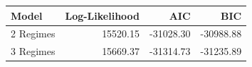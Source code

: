 \begin{tabular}{lrrr}
\toprule
Model & Log-Likelihood & AIC & BIC \\
\midrule
2 Regimes & 15520.15 & -31028.30 & -30988.88 \\
3 Regimes & 15669.37 & -31314.73 & -31235.89 \\
\bottomrule
\end{tabular}
